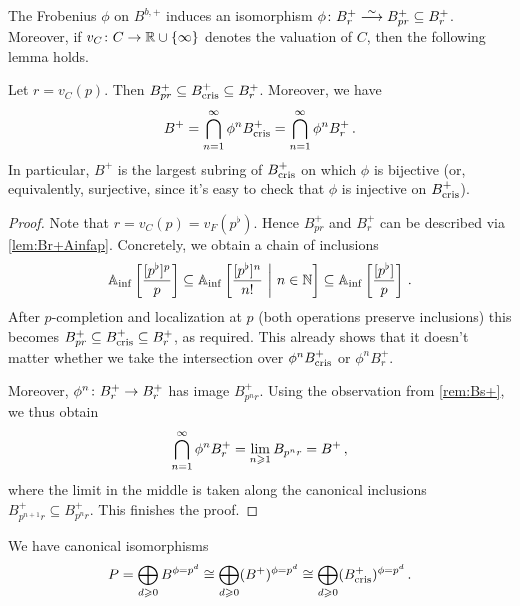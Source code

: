 \documentclass[a4paper, 10pt, oneside, DIV=9, chapterprefix=true, numbers=enddot,bibliography=totoc]{scrbook}
\begin{document}
The Frobenius $\phi$ on $B^{b,+}$ induces an isomorphism $\phi\colon B_r^+\isomorphism B_{pr}^+\subseteq B_r^+$. Moreover, if $v_C\colon C\morphism \IR\cup\{\infty\}$ denotes the valuation of $C$, then the following lemma holds.
\begin{lem}\label{lem:B+}
	Let $r=v_C(p)$. Then $B_{pr}^+\subseteq B_{\mathrm{cris}}^+\subseteq B_r^+$. Moreover, we have
	\begin{equation*}
		B^+=\bigcap_{n=1}^\infty \phi^nB_\cris^+=\bigcap_{n=1}^\infty \phi^nB_r^+\,.
	\end{equation*}
	In particular, $B^+$ is the largest subring of $B_{\mathrm{cris}}^+$ on which $\phi$ is bijective (or, equivalently, surjective, since it's easy to check that $\phi$ is injective on $B_{\mathrm{cris}}^+$).
\end{lem}
\begin{proof}
	Note that $r=v_C(p)=v_F(p^\flat)$. Hence $B_{pr}^+$ and $B_r^+$ can be described via \cref{lem:Br+Ainfap}. Concretely, we obtain a chain of inclusions
	\begin{equation*}
		\mathbb{A}_{\mathrm{inf}}\left[\frac{[p^\flat]^p}{p}\right]\subseteq \mathbb{A}_{\mathrm{inf}}\left[\frac{[p^\flat]^n}{n!}\ \middle|\  n\in\mathbb{N}\right]\subseteq \mathbb{A}_{\mathrm{inf}}\left[\frac{[p^\flat]}{p}\right]\,.
	\end{equation*}
	After $p$-completion and localization at $p$ (both operations preserve inclusions) this becomes $B_{pr}^+\subseteq B_{\mathrm{cris}}^+\subseteq B_r^+$, as required. This already shows that it doesn't matter whether we take the intersection over $\phi^nB_\cris^+$ or $\phi^nB_r^+$.
	
	Moreover, $\phi^n\colon B_r^+\morphism B_r^+$ has image $B_{p^nr}^+$. Using the observation from \cref{rem:Bs+}, we thus obtain
	\begin{equation*}
		\bigcap_{n=1}^\infty\phi^nB_r^+=\limit_{n\geq 1}B_{p^nr}=B^+\,,
	\end{equation*}
	where the limit in the middle is taken along the canonical inclusions $B_{p^{n+1}r}^+\subseteq B_{p^nr}^+$. This finishes the proof.
\end{proof}
\begin{prop}\label{prop:FFandBcris}
	We have canonical isomorphisms
	\begin{equation*}
		P=\bigoplus_{d\geq 0}B^{\phi=p^d}\cong \bigoplus_{d\geq 0}(B^+)^{\phi=p^d}\cong \bigoplus_{d\geq 0} (B_\cris^+)^{\phi=p^d}\,.
	\end{equation*}
\end{prop}
\end{document}
